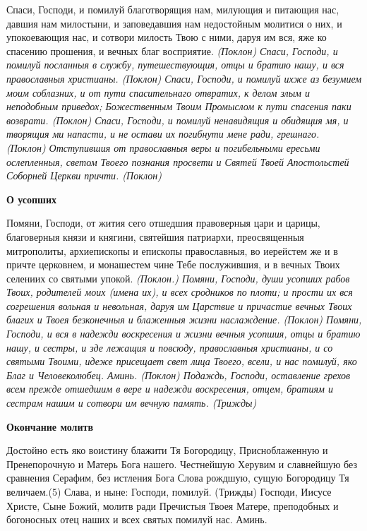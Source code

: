 Спаси, Господи, и помилуй благотворящия нам, милующия и питающия нас, давшия нам милостыни, и заповедавшия нам недостойным молитися о них, и упокоевающия нас, и сотвори милость Твою с ними, даруя им вся, яже ко спасению прошения, и вечных благ восприятие. \itshape (Поклон)\normalfont{} 
Спаси, Господи, и помилуй посланныя в службу, путешествующия, отцы и братию нашу, и вся православныя христианы. \itshape (Поклон)\normalfont{}
Спаси, Господи, и помилуй ихже аз безумием моим соблазних, и от пути спасительнаго отвратих, к делом злым и неподобным приведох; Божественным Твоим Промыслом к пути спасения паки возврати. \itshape (Поклон) \normalfont{}
Спаси, Господи, и помилуй ненавидящия и обидящия мя, и творящия ми напасти, и не остави их погибнути мене ради, грешнаго. \itshape (Поклон)\normalfont{}
Отступившия от православныя веры и погибельными ересьми ослепленныя, светом Твоего познания просвети и Святей Твоей Апостольстей Соборней Церкви причти. \itshape (Поклон) \normalfont{}


\medskip
\bfseries О усопших


\normalfont{}Помяни, Господи, от жития сего отшедшия правоверныя цари и царицы, благоверныя князи и княгини, святейшия патриархи, преосвященныя митрополиты, архиепископы и епископы православныя, во иерейстем же и в причте церковнем, и монашестем чине Тебе послужившия, и в вечных Твоих селениих со святыми упокой. \itshape (Поклон.)\normalfont{} 
Помяни, Господи, души усопших рабов Твоих, родителей моих \itshape (имена их)\normalfont{}, и всех сродников по плоти; и прости их вся согрешения вольная и невольная, даруя им Царствие и причастие вечных Твоих благих и Твоея безконечныя и блаженныя жизни наслаждение. \itshape (Поклон) \normalfont{}
Помяни, Господи, и вся в надежди воскресения и жизни вечныя усопшия, отцы и братию нашу, и сестры, и зде лежащия и повсюду, православныя христианы, и со святыми Твоими, идеже присещает свет лица Твоего, всели, и нас помилуй, яко Благ и Человеколюбец. Аминь. \itshape (Поклон) \normalfont{}
Подаждь, Господи, оставление грехов всем прежде отшедшим в вере и надежди воскресения, отцем, братиям и сестрам нашим и сотвори им вечную память. \itshape (Трижды)\normalfont{}


\medskip
\bfseries 
Окончание молитв


\normalfont{}Достойно есть яко воистину блажити Тя Богородицу, Присноблаженную и Пренепорочную и Матерь Бога нашего. Честнейшую Херувим и славнейшую без сравнения Серафим, без истления Бога Слова рождшую, сущую Богородицу Тя величаем.(5) Слава, и ныне: Господи, помилуй. (Трижды) Господи, Иисусе Христе, Сыне Божий, молитв ради Пречистыя Твоея Матере, преподобных и богоносных отец наших и всех святых помилуй нас. Аминь. 


